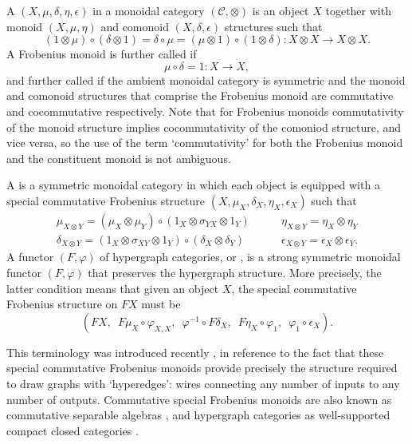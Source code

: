 A  $(X,\mu,\delta,\eta,\epsilon)$ in a monoidal
category $(\mathcal C, \otimes)$ is an object $X$ together with monoid $(X,\mu,
\eta)$ and comonoid $(X,\delta,\epsilon)$ structures such that
\[
  (1 \otimes \mu) \circ (\delta \otimes 1) = \delta \circ \mu = (\mu \otimes 1)
  \circ (1 \otimes \delta)\colon  X \otimes X \longrightarrow X \otimes X.
\]
A Frobenius monoid is further called  if 
\[
  \mu \circ \delta = 1\colon  X \longrightarrow X,
\]
and further called  if the ambient monoidal category is symmetric
and the monoid and comonoid structures that comprise the Frobenius monoid are
commutative and cocommutative respectively. Note that for Frobenius monoids
commutativity of the monoid structure implies cocommutativity of the comoniod
structure, and vice versa, so the use of the term `commutativity' for both the
Frobenius monoid and the constituent monoid is not ambiguous.

A  is a
symmetric monoidal category in which each object is equipped with a special
commutative Frobenius structure $(X,\mu_X,\delta_X,\eta_X,\epsilon_X)$ such that 
\[
  \begin{array}{cc}
    \mu_{X\otimes Y} = (\mu_X \otimes \mu_Y)\circ(1_X \otimes \sigma_{YX}\otimes
    1_Y) \qquad&
    \eta_{X\otimes Y} = \eta_X \otimes \eta_Y \\
    \delta_{X\otimes Y} = (1_X \otimes \sigma_{XY}\otimes 1_Y)\circ(\delta_X
    \otimes \delta_Y) \qquad&
    \epsilon_{X\otimes Y} = \epsilon_X \otimes \epsilon_Y.
  \end{array}
\]
A functor $(F,\varphi)$ of hypergraph categories, or , is a strong symmetric monoidal functor $(F,\varphi)$ that preserves
the hypergraph structure. More precisely, the latter condition means that given
an object $X$, the special commutative Frobenius structure on $FX$ must be 
\[
  (FX,\enspace F\mu_X \circ \varphi_{X,X},\enspace  \varphi^{-1} \circ F\delta_X,\enspace  F\eta_X \circ
\varphi_1,\enspace  \varphi_1 \circ \epsilon_X).
\]

This terminology was introduced recently \cite{Ki}, in reference to the fact
that these special commutative Frobenius monoids provide precisely the structure
required to draw graphs with `hyperedges': wires connecting any number of
inputs to any number of outputs. Commutative special Frobenius monoids are also
known as commutative separable algebras \cite{RSW}, and hypergraph categories as
well-supported compact closed categories \cite{Ca}.

